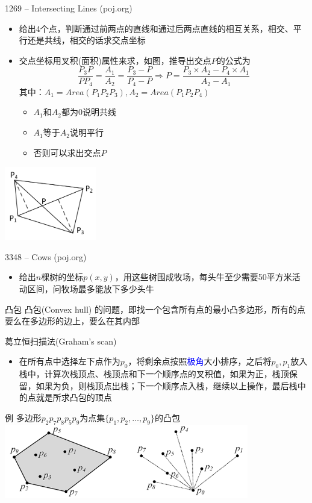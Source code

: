 \begin{frame}{1269 -- Intersecting Lines (poj.org)}
    \begin{itemize}
        \item 给出4个点，判断通过前两点的直线和通过后两点直线的相互关系，相交、平行还是共线，相交的话求交点坐标
        \item 交点坐标用叉积(面积)属性来求，如图，推导出交点$P$的公式为
        $$\frac{P_3P}{PP_4}=\frac{A_1}{A_2}=\frac{P_3-P}{P_4-P}\Rightarrow P=\frac{P_3\times A_2-P_4\times A_1}{A_2-A_1}$$
        其中：$A_1=Area(P_1P_2P_3),A_2=Area(P_1P_2P_4)$
        \begin{itemize}
            \item $A_1$和$A_2$都为0说明共线
            \item $A_1$等于$A_2$说明平行
            \item 否则可以求出交点$P$
        \end{itemize}
    \end{itemize} 
    \includegraphics[width=0.3\textwidth,right]{fig/9-6.png} 
\end{frame}
\begin{frame}{3348 -- Cows (poj.org)}
    \begin{itemize}
        \item 给出$n$棵树的坐标$p(x,y)$，用这些树围成牧场，每头牛至少需要50平方米活动区间，问牧场最多能放下多少头牛
    \end{itemize} 
    \vfill
    \begin{block}{凸包}
        凸包(Convex hull) 的问题，即找一个包含所有点的最小凸多边形，所有的点要么在多边形的边上，要么在其内部
    \end{block}
\end{frame}
\begin{frame}{葛立恒扫描法(Graham's scan)}
    \begin{itemize}
        \item 在所有点中选择左下点作为$p_0$，将剩余点按照\textcolor{blue}{极角}大小排序，之后将$p_0,p_1$放入栈中，计算次栈顶点、栈顶点和下一个顺序点的叉积值，如果为正，栈顶保留，如果为负，则栈顶点出栈；下一个顺序点入栈，继续以上操作，最后栈中的点就是所求凸包的顶点
    \end{itemize}
    \begin{exampleblock}{例}
        多边形$p_2p_7p_8p_5p_9$为点集$\{ p_1,p_2,\ldots ,p_9\}$的凸包
        \includegraphics[width=0.8\textwidth,center]{fig/9-7.png}
    \end{exampleblock}
\end{frame}
